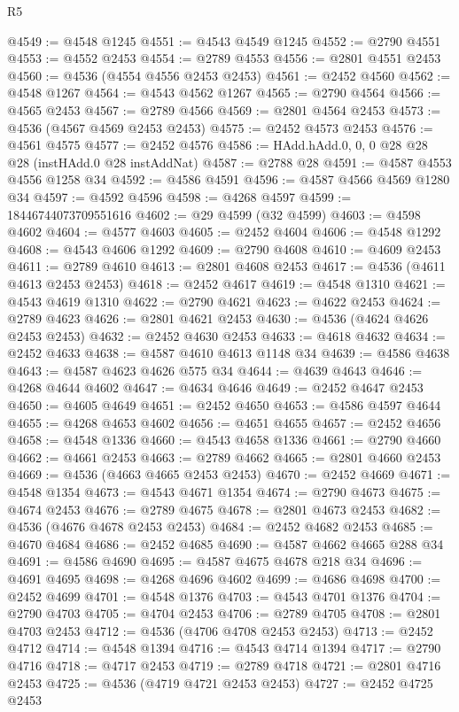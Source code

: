 \begin{lexlean}{R5}
\begin{coremodule}
@4549 := @4548 @1245
@4551 := @4543 @4549 @1245
@4552 := @2790 @4551
@4553 := @4552 @2453
@4554 := @2789 @4553
@4556 := @2801 @4551 @2453
@4560 := @4536 (@4554 @4556 @2453 @2453)
@4561 := @2452 @4560
@4562 := @4548 @1267
@4564 := @4543 @4562 @1267
@4565 := @2790 @4564
@4566 := @4565 @2453
@4567 := @2789 @4566
@4569 := @2801 @4564 @2453
@4573 := @4536 (@4567 @4569 @2453 @2453)
@4575 := @2452 @4573 @2453
@4576 := @4561 @4575
@4577 := @2452 @4576
@4586 := HAdd.hAdd.{0, 0, 0} @28 @28 @28 (instHAdd.{0} @28 instAddNat)
@4587 := @2788 @28
@4591 := @4587 @4553 @4556 @1258 @34
@4592 := @4586 @4591
@4596 := @4587 @4566 @4569 @1280 @34
@4597 := @4592 @4596
@4598 := @4268 @4597
@4599 := 18446744073709551616
@4602 := @29 @4599 (@32 @4599)
@4603 := @4598 @4602
@4604 := @4577 @4603
@4605 := @2452 @4604
@4606 := @4548 @1292
@4608 := @4543 @4606 @1292
@4609 := @2790 @4608
@4610 := @4609 @2453
@4611 := @2789 @4610
@4613 := @2801 @4608 @2453
@4617 := @4536 (@4611 @4613 @2453 @2453)
@4618 := @2452 @4617
@4619 := @4548 @1310
@4621 := @4543 @4619 @1310
@4622 := @2790 @4621
@4623 := @4622 @2453
@4624 := @2789 @4623
@4626 := @2801 @4621 @2453
@4630 := @4536 (@4624 @4626 @2453 @2453)
@4632 := @2452 @4630 @2453
@4633 := @4618 @4632
@4634 := @2452 @4633
@4638 := @4587 @4610 @4613 @1148 @34
@4639 := @4586 @4638
@4643 := @4587 @4623 @4626 @575 @34
@4644 := @4639 @4643
@4646 := @4268 @4644 @4602
@4647 := @4634 @4646
@4649 := @2452 @4647 @2453
@4650 := @4605 @4649
@4651 := @2452 @4650
@4653 := @4586 @4597 @4644
@4655 := @4268 @4653 @4602
@4656 := @4651 @4655
@4657 := @2452 @4656
@4658 := @4548 @1336
@4660 := @4543 @4658 @1336
@4661 := @2790 @4660
@4662 := @4661 @2453
@4663 := @2789 @4662
@4665 := @2801 @4660 @2453
@4669 := @4536 (@4663 @4665 @2453 @2453)
@4670 := @2452 @4669
@4671 := @4548 @1354
@4673 := @4543 @4671 @1354
@4674 := @2790 @4673
@4675 := @4674 @2453
@4676 := @2789 @4675
@4678 := @2801 @4673 @2453
@4682 := @4536 (@4676 @4678 @2453 @2453)
@4684 := @2452 @4682 @2453
@4685 := @4670 @4684
@4686 := @2452 @4685
@4690 := @4587 @4662 @4665 @288 @34
@4691 := @4586 @4690
@4695 := @4587 @4675 @4678 @218 @34
@4696 := @4691 @4695
@4698 := @4268 @4696 @4602
@4699 := @4686 @4698
@4700 := @2452 @4699
@4701 := @4548 @1376
@4703 := @4543 @4701 @1376
@4704 := @2790 @4703
@4705 := @4704 @2453
@4706 := @2789 @4705
@4708 := @2801 @4703 @2453
@4712 := @4536 (@4706 @4708 @2453 @2453)
@4713 := @2452 @4712
@4714 := @4548 @1394
@4716 := @4543 @4714 @1394
@4717 := @2790 @4716
@4718 := @4717 @2453
@4719 := @2789 @4718
@4721 := @2801 @4716 @2453
@4725 := @4536 (@4719 @4721 @2453 @2453)
@4727 := @2452 @4725 @2453

\end{coremodule}
\end{lexlean}
